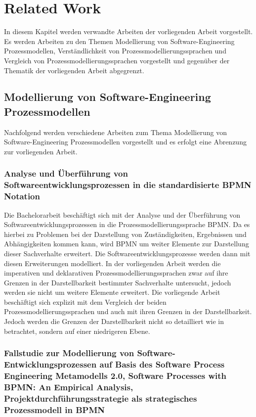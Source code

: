 \chapter{Related Work}\label{sec:chapter9}

In diesem Kapitel werden verwandte Arbeiten der vorliegenden Arbeit vorgestellt. Es werden Arbeiten zu den Themen Modellierung von Software-Engineering Prozessmodellen, Verständlichkeit von Prozessmodellierungssprachen und Vergleich von Prozessmodellierungssprachen vorgestellt und gegenüber der Thematik der vorliegenden Arbeit abgegrenzt.

\section{Modellierung von Software-Engineering Prozessmodellen}

Nachfolgend werden verschiedene Arbeiten zum Thema Modellierung von Software-Engineering Prozessmodellen vorgestellt und es erfolgt eine Abrenzung zur vorliegenden Arbeit.\newline

\subsection {Analyse und Überführung von Softwareentwicklungsprozessen in die standardisierte BPMN Notation}
Die Bachelorarbeit \cite{Menhorn2014} beschäftigt sich mit der Analyse und der Überführung von Softwareentwicklungsprozessen in die Prozessmodellierungssprache BPMN. Da es hierbei zu Problemen bei der Darstellung von Zuständigkeiten, Ergebnissen und Abhängigkeiten kommen kann, wird BPMN um weiter Elemente zur Darstellung dieser Sachverhalte erweitert. Die Softwareentwicklungsprozesse werden dann mit diesen Erweiterungen modelliert.\newline
In der vorliegenden Arbeit werden die imperativen und deklarativen Prozessmodellierungssprachen zwar auf ihre Grenzen in der Darstellbarkeit bestimmter Sachverhalte untersucht, jedoch werden sie nicht um weitere Elemente erweitert. Die vorliegende Arbeit beschäftigt sich explizit mit dem Vergleich der beiden Prozessmodellierungssprachen und auch mit ihren Grenzen in der Darstellbarkeit. Jedoch werden die Grenzen der Darstellbarkeit nicht so detailliert wie in \cite{Menhorn2014} betrachtet, sondern auf einer niedrigeren Ebene. \newline


\subsection{Fallstudie zur Modellierung von Software-Entwicklungsprozessen auf Basis des Software Process Engineering Metamodells 2.0, Software Processes with BPMN: An Empirical Analysis, Projektdurchführungsstrategie als strategisches Prozessmodell in BPMN}



